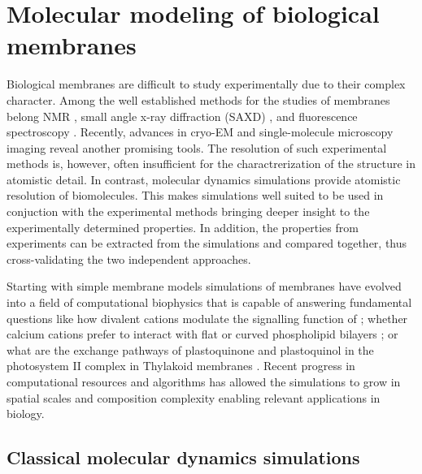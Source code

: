 \chapter{Molecular modeling of biological membranes}
\label{chap:methods}

Biological membranes are difficult to study experimentally due to their complex character. 
Among the well established methods for the studies of membranes belong
 NMR                                 \citep{catte16, botan15, seelig80, seelig90, seelig87}, 
small angle x-ray diffraction (SAXD) \citep{ollila16, pabst07}, 
and fluorescence spectroscopy        \citep{javanainen17, melcrova16}. 
Recently, advances in cryo-EM          \citep{chiu2017editorial, nogales2015development}
and single-molecule microscopy imaging \citep{ritchie2013single}
reveal another promising tools. 
The resolution of such experimental methods is, however, often insufficient 
for the charactrerization of the structure in atomistic detail. 
In contrast, molecular dynamics simulations provide atomistic resolution of biomolecules.
This makes simulations well suited to be used in conjuction with the experimental methods
bringing deeper insight to the experimentally determined properties. 
In addition, the properties from experiments can be extracted from the simulations 
and compared together, thus cross-validating the two independent approaches. 

Starting with simple membrane models \citep{Berger97, bockmann04, bockmann03, sachs04, sachs04_potential} 
simulations of membranes have evolved into a field of computational biophysics
that is capable of answering fundamental questions like
how divalent cations modulate the signalling function of  \citep{Bilkova2017Calcium}; 
whether calcium cations prefer to interact with flat or curved phospholipid bilayers \citep{magarkar2017};
or what are the exchange pathways of plastoquinone and plastoquinol in the photosystem II complex in Thylakoid membranes \citep{eerden17}. 
Recent progress in computational resources and algorithms
has allowed the simulations to grow in spatial scales and composition complexity 
enabling relevant applications in biology. \citep{perspective_cecam_lugano_2018} 


\section{Classical molecular dynamics simulations}
\label{section:md}

